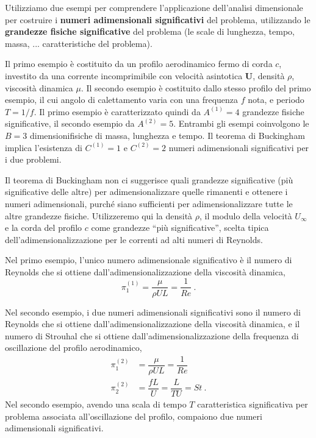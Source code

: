 Utilizziamo due esempi per comprendere l'applicazione dell'analisi dimensionale per costruire i \textbf{numeri adimensionali significativi} del problema, utilizzando le \textbf{grandezze fisiche significative} del problema (le scale di lunghezza, tempo, massa, ... caratteristiche del problema).

Il primo esempio è costituito da un profilo aerodinamico fermo di corda $c$, investito da una corrente incomprimibile con velocità asintotica $\bm{U}$, densità $\rho$, viscosità dinamica $\mu$.
Il secondo esempio è costituito dallo stesso profilo del primo esempio, il cui angolo di calettamento varia con una frequenza $f$ nota, e periodo $T = 1/f$.
Il primo esempio è caratterizzato quindi da $A^{(1)} = 4$ grandezze fisiche significative, il secondo esempio da $A^{(2)} = 5$. Entrambi gli esempi coinvolgono le $B=3$ dimensionifisiche di massa, lunghezza e tempo. Il teorema di Buckingham implica l'esistenza di $C^{(1)} = 1$ e $C^{(2)}=2$ numeri adimensionali significativi per i due problemi.

Il teorema di Buckingham non ci suggerisce quali grandezze significative (più significative delle altre) per adimensionalizzare quelle rimanenti e ottenere i numeri adimensionali, purché siano sufficienti per adimensionalizzare tutte le altre grandezze fisiche. Utilizzeremo qui la densità $\rho$, il modulo della velocità $U_{\infty}$ e la corda del profilo $c$ come grandezze ``più significative'', scelta tipica dell'adimensionalizzazione per le correnti ad alti numeri di Reynolds.

Nel primo esempio, l'unico numero adimensionale significativo è il numero di Reynolds che si ottiene dall'adimensionalizzazione della viscosità dinamica,
\begin{equation}
 \pi^{(1)}_1 = \dfrac{\mu}{\rho U L} = \dfrac{1}{Re} \ .
\end{equation}

Nel secondo esempio, i due numeri adimensionali significativi sono il numero di Reynolds che si ottiene dall'adimensionalizzazione della viscosità dinamica, e il numero di Strouhal che si ottiene dall'adimensionalizzazione della frequenza di oscillazione del profilo aerodinamico,
\begin{equation}
\begin{aligned}
 \pi^{(2)}_1 & = \dfrac{\mu}{\rho U L} = \dfrac{1}{Re} \\
 \pi^{(2)}_2 & = \dfrac{f L}{ U }      =\dfrac{L}{T U} = St \ .
\end{aligned}
\end{equation}
Nel secondo esempio, avendo una scala di tempo $T$ caratteristica significativa per problema associata all'oscillazione del profilo, compaiono due numeri adimensionali significativi.

